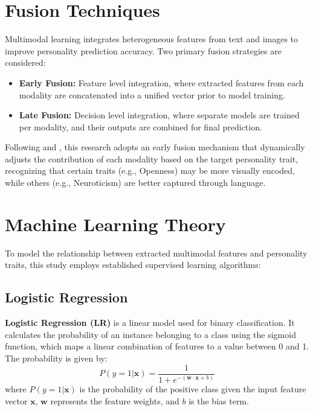 \section{Fusion Techniques}

Multimodal learning integrates heterogeneous features from text and images to improve personality prediction accuracy. Two primary fusion strategies are considered:

\begin{itemize}
	\item \textbf{Early Fusion:} Feature level integration, where extracted features from each modality are concatenated into a unified vector prior to model training.
	\item \textbf{Late Fusion:} Decision level integration, where separate models are trained per modality, and their outputs are combined for final prediction.
\end{itemize}

Following \citet{liu2022} and \citet{kampman2018}, this research adopts an early fusion mechanism that dynamically adjusts the contribution of each modality based on the target personality trait, recognizing that certain traits (e.g., Openness) may be more visually encoded, while others (e.g., Neuroticism) are better captured through language.

\section{Machine Learning Theory}

To model the relationship between extracted multimodal features and personality traits, this study employs established supervised learning algorithms:

\subsection{Logistic Regression}
\textbf{Logistic Regression (LR)} is a linear model used for binary classification. It calculates the probability of an instance belonging to a class using the sigmoid function, which maps a linear combination of features to a value between 0 and 1. The probability is given by:
$$P(y=1 | \mathbf{x}) = \frac{1}{1 + e^{-(\mathbf{w} \cdot \mathbf{x} + b)}}$$
where $P(y=1|\mathbf{x})$ is the probability of the positive class given the input feature vector $\mathbf{x}$, $\mathbf{w}$ represents the feature weights, and $b$ is the bias term.

